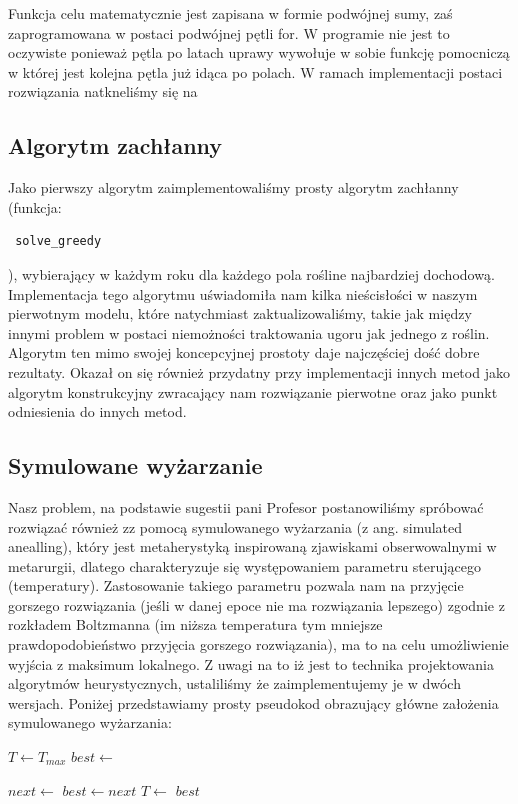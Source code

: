 \documentclass{article}
\begin{document}
Funkcja celu matematycznie jest zapisana w formie podwójnej sumy, zaś zaprogramowana w postaci podwójnej pętli for.
	W programie nie jest to oczywiste ponieważ pętla po latach uprawy wywołuje w sobie funkcję pomocniczą w której jest kolejna pętla już idąca po polach.
W ramach implementacji postaci rozwiązania natkneliśmy się na

\subsection{Algorytm zachłanny}
Jako pierwszy algorytm zaimplementowaliśmy prosty algorytm zachłanny (funkcja:\begin{verbatim} solve_greedy \end{verbatim}), wybierający w każdym roku dla każdego pola rośline najbardziej dochodową. Implementacja tego algorytmu uświadomiła nam kilka nieścisłości w naszym pierwotnym modelu, które natychmiast zaktualizowaliśmy, takie jak między innymi problem w postaci niemożności traktowania ugoru jak jednego z roślin. Algorytm ten mimo swojej koncepcyjnej prostoty daje najczęściej dość dobre rezultaty. Okazał on się również przydatny przy implementacji innych metod jako algorytm konstrukcyjny zwracający nam rozwiązanie pierwotne oraz jako punkt odniesienia do innych metod.

\subsection{Symulowane wyżarzanie}
Nasz problem, na podstawie sugestii pani Profesor postanowiliśmy spróbować rozwiązać również zz pomocą  symulowanego wyżarzania (z ang. simulated anealling), który jest metaherystyką inspirowaną zjawiskami obserwowalnymi w metarurgii, dlatego charakteryzuje się występowaniem parametru sterującego (temperatury). Zastosowanie takiego parametru pozwala nam na przyjęcie gorszego rozwiązania (jeśli w danej epoce nie ma rozwiązania lepszego) zgodnie z rozkładem Boltzmanna (im niższa temperatura tym mniejsze prawdopodobieństwo przyjęcia gorszego rozwiązania), ma to na celu umożliwienie wyjścia z maksimum lokalnego. Z uwagi na to iż jest to technika projektowania algorytmów heurystycznych, ustaliliśmy że zaimplementujemy je w dwóch wersjach.
Poniżej przedstawiamy prosty pseudokod obrazujący główne założenia symulowanego wyżarzania:
\newline

\begin{algorithmic}
\State $T\gets T_{max}$
\State $best\gets$ \textbf{}

	\State $next\gets $ \textbf{}
      \State $best\gets next$
	\EndIf
	\State $T\gets$ \textbf{}
\EndWhile
\Return $best$
\EndFunction
\end{algorithmic}
\end{document}

